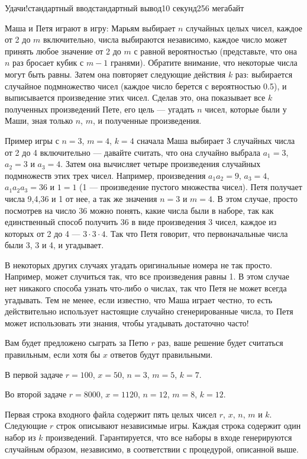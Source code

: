 \begin{problem}{Удачи!}{стандартный ввод}{стандартный вывод}{10 секунд}{256 мегабайт}

 Маша и Петя играют в игру: Марьям выбирает $n$ случайных целых чисел, каждое от 2 до $m$ включительно, числа выбираются независимо, каждое число может принять любое значение от 2 до $m$ с равной вероятностью (представьте, что она $n$ раз бросает кубик с $m-1$ гранями). Обратите внимание, что некоторые числа могут быть равны. Затем она повторяет следующие действия $k$ раз: выбирается случайное подмножество чисел (каждое число берется с вероятностью 0.5), и выписывается произведение этих чисел. Сделав это, она показывает все $k$ полученных произведений Пете, его цель --- угадать $n$ чисел, которые были у Маши, зная только $n$, $m$, и полученные произведения.

Пример игры с $n = 3$, $m = 4$, $k = 4$ сначала Маша выбирает 3 случайных числа от 2 до 4 включительно --- давайте считать, что она случайно выбрала $a_1 = 3$, $a_2 = 3$ и $a_3 = 4$. Затем она вычисляет четыре произведения случайных подмножеств этих трех чисел. Например, произведения $a_1 a_2 = 9$, $a_3 = 4$, $a_1 a_2 a_3 = 36$ и $1 = 1$ (1 --- произведение пустого множества чисел). Петя получает числа 9,4,36 и 1 от нее, а так же значения $n = 3$ и $m = 4$. В этом случае, просто посмотрев на число 36 можно понять, какие числа были в наборе, так как единственный способ получить 36 в виде произведения 3 чисел, каждое из которых от 2 до 4 --- $3 \cdot 3 \cdot 4$. Так что Петя говорит, что первоначальные числа были 3, 3 и 4, и угадывает.

В некоторых других случаях угадать оригинальные номера не так просто. Например, может случиться так, что все произведения равны 1. В этом случае нет никакого способа узнать что-либо о числах, так что Петя не может всегда угадывать. Тем не менее, если известно, что Маша играет честно, то есть действительно использует настоящие случайно сгенерированные числа, то Петя может использовать эти знания, чтобы угадывать достаточно часто!

Вам будет предложено сыграть за Петю $r$ раз, ваше решение будет считаться правильным, если хотя бы $x$ ответов будут правильными. 

В первой задаче $r = 100$, $x = 50$, $n = 3$, $m = 5$, $k = 7$.

Во второй задаче $r = 8000$, $x = 1120$, $n = 12$, $m = 8$, $k = 12$.


\InputFile
Первая строка входного файла содержит пять целых чисел $r$, $x$, $n$, $m$ и $k$. Следующие $r$ строк описывают независимые игры. Каждая строка содержит один набор из $k$ произведений. Гарантируется, что все наборы в входе генерируются случайным образом, независимо, в соответствии с процедурой, описанной выше.



\end{problem}
